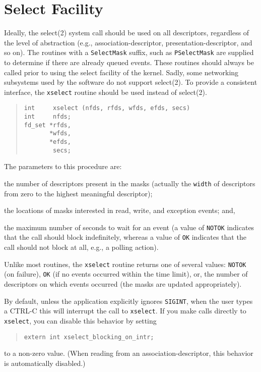 \section	{Select Facility}\label{acs:select}
Ideally,
the \man select(2) system call should be used on all descriptors,
regardless of the level of abstraction
(e.g., association-descriptor, presentation-descriptor, and so on).
The routines with a \verb"SelectMask" suffix,
such as \verb"PSelectMask"
are supplied to determine if there are already queued events.
These routines should always be called prior to using the select facility
of the kernel.
Sadly, some networking subsystems used by the software do not support
\man select(2).
To provide a consistent interface,
the \verb"xselect" routine should be used instead of \man select(2).
\begin{quote}\small\begin{verbatim}
int     xselect (nfds, rfds, wfds, efds, secs)
int     nfds;
fd_set *rfds,
       *wfds,
       *efds,
        secs;
\end{verbatim}\end{quote}
The parameters to this procedure are:
\begin{describe}
\item[\verb"nfds":] the number of descriptors present in the masks
(actually the \verb"width" of descriptors from zero to the highest meaningful
descriptor);

\item[\verb"rfds"/\verb"wfds"/\verb"efds":] the locations of
masks interested in read, write, and exception events;
and,

\item[\verb"secs":] the maximum number of seconds to wait for an event
(a value of \verb"NOTOK" indicates that the call should block indefinitely,
whereas a value of \verb"OK" indicates that the call should not block at all,
e.g., a polling action).
\end{describe}
Unlike most routines,
the \verb"xselect" routine returns one of several values:
\verb"NOTOK" (on failure),
\verb"OK" (if no events occurred within the time limit),
or,
the number of descriptors on which events occurred
(the masks are updated appropriately).

By default,
unless the application explicitly ignores \verb"SIGINT",
when the user types a CTRL-C this will interrupt the call to \verb"xselect".
If you make calls directly to \verb"xselect",
you can disable this behavior by setting
\begin{quote}\small\begin{verbatim}
extern int xselect_blocking_on_intr;
\end{verbatim}\end{quote}
to a non-zero value.
(When reading from an association-descriptor,
this behavior is automatically disabled.)

